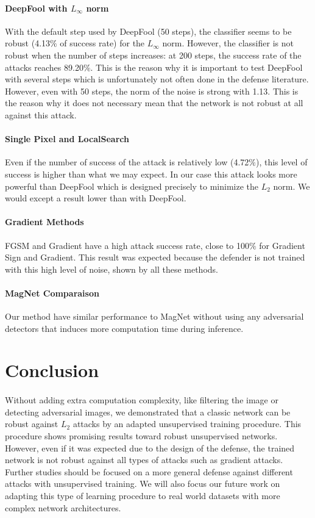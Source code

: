 \documentclass[12pt]{article}
\begin{document}
\paragraph{DeepFool with $L_{\infty}$ norm}
With the default step used by DeepFool (50 steps), the classifier seems to be robust (4.13$\%$ of success rate) for the $L_{\infty}$ norm. However, the classifier is not robust when the number of steps increases: at 200 steps, the success rate of the attacks reaches 89.20$\%$. This is the reason why it is important to test DeepFool with several steps which is unfortunately not often done in the defense literature. However, even with 50 steps, the norm of the noise is strong with 1.13. This is  the reason why it does not necessary mean that the network is not robust at all against this attack.

\paragraph{Single Pixel and LocalSearch}
Even if the number of success of the attack is relatively low (4.72$\%$), this level of success is higher than what we may expect. In our case this attack looks more powerful than DeepFool which is designed precisely to minimize the $L_{2}$ norm. We would except a result lower than with DeepFool.

\paragraph{Gradient Methods}
FGSM and Gradient have a high attack success rate, close to 100$\%$ for Gradient Sign and Gradient. This result was expected because the defender is not trained with this high level of noise, shown by all these methods.

\paragraph{MagNet Comparaison}
Our method have similar performance to MagNet \cite{meng_magnet:_2017} without using any adversarial detectors that induces more computation time during inference.

\section{Conclusion}
\paragraph{}
Without adding extra computation complexity, like filtering the image or detecting adversarial images, we demonstrated that a classic network can be robust against $L_{2}$ attacks by an adapted unsupervised training procedure. This procedure shows promising results toward robust unsupervised networks. However, even if it was expected due to the design of the defense, the trained network is not robust against all types of attacks such as gradient attacks. Further studies should be focused on a more general defense against different attacks with unsupervised training. We will also focus our future work on adapting this type of learning procedure to real world datasets with more complex network architectures.

\newpage
{}

\end{document}
